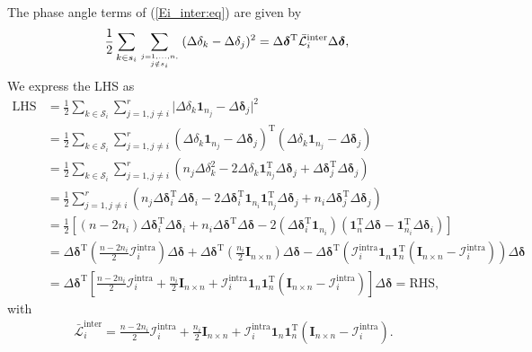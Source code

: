 \documentclass[12pt, draftclsnofoot,onecolumn]{IEEEtran}
\begin{document}
\noindent The phase angle terms of (\ref{Ei_inter:eq}) are given by
\begin{align}
\frac{1}{2}\sum_{k\in s_i}\sum_{j=1,...,n,\atop j \notin s_i}{(\Delta \delta_k-\Delta \delta_j)^2} &= \Delta \boldsymbol{\delta}^{\mathrm{T}} \bar {\mathcal L}_i^{\mathrm{inter}}  \Delta \boldsymbol{\delta},
\end{align}
\noindent We express the LHS as
\begin{align}
\mathrm{LHS} &= \frac{1}{2} \sum_{k\in \mathcal{S}_i}\sum_{j=1,j\neq i}^r \vert \Delta \delta_k \boldsymbol{1}_{n_j} - \Delta \boldsymbol{\delta}_j \vert ^2  \nonumber \\
&= \frac{1}{2} \sum_{k\in \mathcal{S}_i}\sum_{j=1,j\neq i}^r \left(\Delta \delta_k \boldsymbol{1}_{n_j} - \Delta \boldsymbol{\delta}_j \right)^{\mathrm{T}} \left(\Delta \delta_k \boldsymbol{1}_{n_j} - \Delta \boldsymbol{\delta}_j \right) \nonumber\\
&= \frac{1}{2} \sum_{k\in \mathcal{S}_i}\sum_{j=1,j\neq i}^r \left( n_j \Delta \delta_k^2 -2 \Delta \delta_k \boldsymbol{1}_{n_j}^{\mathrm{T}}\Delta \boldsymbol{\delta}_j + \Delta\boldsymbol{\delta}_j^{\mathrm{T}} \Delta\boldsymbol{\delta}_j \right) \nonumber\\
&= \frac{1}{2} \sum_{j=1,j\neq i}^r \left( n_j \Delta \boldsymbol{\delta}_i^{\mathrm{T}}\Delta \boldsymbol{\delta}_i -2 \Delta \boldsymbol{\delta}_i^{\mathrm{T}} \boldsymbol{1}_{n_i} \boldsymbol{1}_{n_j}^{\mathrm{T}}\Delta \boldsymbol{\delta}_j + n_i \Delta\boldsymbol{\delta}_j^{\mathrm{T}} \Delta\boldsymbol{\delta}_j\right) \nonumber\\
& = \frac{1}{2}[(n-2n_i)\Delta\boldsymbol{\delta}_i^{\mathrm{T}} \Delta\boldsymbol{\delta}_i + n_i \Delta \boldsymbol{\delta}^{\mathrm{T}} \Delta\boldsymbol{\delta} - 2(\Delta \boldsymbol{\delta}_i^{\mathrm{T}} \boldsymbol{1}_{n_i})(\boldsymbol{1}_n^{\mathrm{T}}\Delta \boldsymbol{\delta} - \boldsymbol{1}_{n_i}^{\mathrm{T}} \Delta\boldsymbol{\delta}_i)]\nonumber\\
&= \Delta \boldsymbol{\delta}^{\mathrm{T}}(\frac{n-2n_i}{2}{\mathcal I}_i^{\mathrm{intra}}) \Delta \boldsymbol{\delta} + \Delta \boldsymbol{\delta}^{\mathrm{T}} (\frac{n_i}{2}\boldsymbol{I}_{n\times n}) \Delta \boldsymbol{\delta} - \Delta \boldsymbol{\delta}^{\mathrm{T}}({\mathcal I}_i^{\mathrm{intra}} \boldsymbol{1}_{n} \boldsymbol{1}_{n}^{\mathrm{T}} (\boldsymbol{I}_{n\times n} - {\mathcal I}_i^{\mathrm{intra}}) )\Delta \boldsymbol{\delta} \nonumber\\
&= \Delta \boldsymbol{\delta}^{\mathrm{T}}[\frac{n-2n_i}{2}{\mathcal I}_i^{\mathrm{intra}}+
\frac{n_i}{2}\boldsymbol{I}_{n\times n} +
{\mathcal I}_i^{\mathrm{intra}} \boldsymbol{1}_{n} \boldsymbol{1}_{n}^{\mathrm{T}} (\boldsymbol{I}_{n\times n} - {\mathcal I}_i^{\mathrm{intra}}) 
] \Delta \boldsymbol{\delta} = \mathrm{RHS},
\end{align} 
\noindent with
\begin{align}
\bar{\mathcal L}_i^{\mathrm{inter}} = \frac{n-2n_i}{2}{\mathcal I}_i^{\mathrm{intra}}+
\frac{n_i}{2}\boldsymbol{I}_{n\times n} +
{\mathcal I}_i^{\mathrm{intra}} \boldsymbol{1}_{n} \boldsymbol{1}_{n}^{\mathrm{T}} (\boldsymbol{I}_{n\times n} - {\mathcal I}_i^{\mathrm{intra}}).
\end{align}
\end{document}
